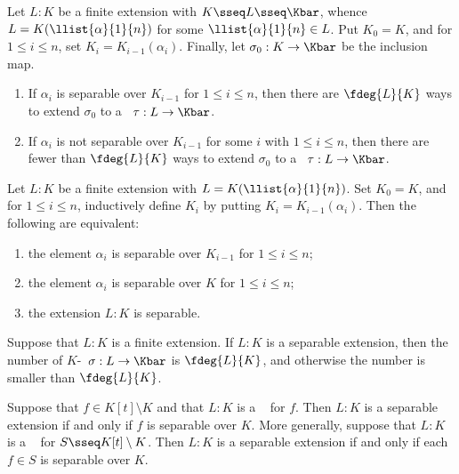 \documentclass{article}
\begin{document}
  \begin{theorem}
    Let $ L:K $ be a finite extension with $ K\sseq L\sseq \Kbar $, whence $ L=K(\llist{\alpha}{1}{n}) $ for some $ \llist{\alpha}{1}{n}\in L $.
    Put $ K_0=K $, and for $ 1\leq i\leq n $, set $ K_i=K_{i-1}(\alpha_i) $.
    Finally, let $ \sigma_0:K\to\Kbar $ be the inclusion map. \begin{enumerate}[label=(\roman*)]
      \item If $ \alpha_i $ is separable over $ K_{i-1} $ for $ 1\leq i\leq n $, then there are $ \fdeg{L}{K} $ ways to extend $ \sigma_0 $ to a \homo~$ \tau:L\to \Kbar $.
      \item If $ \alpha_i $ is not separable over $ K_{i-1} $ for some $ i $ with $ 1\leq i\leq n $, then there are fewer than $ \fdeg{L}{K} $ ways to extend $ \sigma_0 $ to a \homo~$ \tau:L\to \Kbar $.
    \end{enumerate}
  \end{theorem}

  \begin{theorem}
    Let $ L:K $ be a finite extension with $ L=K(\llist{\alpha}{1}{n}) $.
    Set $ K_0=K $, and for $ 1\leq i\leq n $, inductively define $ K_i $ by putting $ K_i=K_{i-1}(\alpha_i) $.
    Then the following are equivalent: \begin{enumerate}[label=(\roman*)]
      \item the element $ \alpha_i $ is separable over $ K_{i-1} $ for $ 1\leq i\leq n $;
      \item the element $ \alpha_i $ is separable over $ K $ for $ 1\leq i\leq n $;
      \item the extension $ L:K $ is separable.
    \end{enumerate}
  \end{theorem}

  \begin{corollary}
    Suppose that $ L:K $ is a finite extension.
    If $ L:K $ is a separable extension, then the number of $ K $-\homo~$ \sigma:L\to\Kbar $ is $ \fdeg{L}{K} $, and otherwise the number is smaller than $ \fdeg{L}{K} $.
  \end{corollary}

  \begin{corollary}
    Suppose that $ f\in K[t]\setminus K $ and that $ L:K $ is a \sfe~ for $ f $.
    Then $ L:K $ is a separable extension if and only if $ f $ is separable over $ K $.
    More generally, suppose that $ L:K $ is a \sfe~ for $ S\sseq K[t]\setminus K $.
    Then $ L:K $ is a separable extension if and only if each $ f\in S $ is separable over $ K $.
  \end{corollary}
\end{document}
